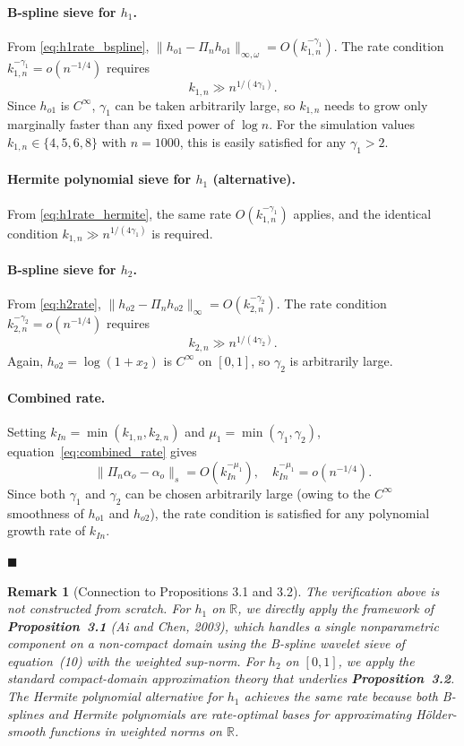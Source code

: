 \documentclass[12pt]{article}
\newtheorem{remark}{Remark}
\begin{document}
\paragraph{B-spline sieve for $h_1$.}
From \eqref{eq:h1rate_bspline}, $\|h_{o1} - \Pi_n h_{o1}\|_{\infty, \omega} = O(k_{1,n}^{-\gamma_1})$. The rate condition $k_{1,n}^{-\gamma_1} = o(n^{-1/4})$ requires
\[
k_{1,n} \gg n^{1/(4\gamma_1)}.
\]
Since $h_{o1}$ is $C^\infty$, $\gamma_1$ can be taken arbitrarily large, so $k_{1,n}$ needs to grow only marginally faster than any fixed power of $\log n$. For the simulation values $k_{1,n} \in \{4, 5, 6, 8\}$ with $n = 1000$, this is easily satisfied for any $\gamma_1 > 2$.

\paragraph{Hermite polynomial sieve for $h_1$ (alternative).}
From \eqref{eq:h1rate_hermite}, the same rate $O(k_{1,n}^{-\gamma_1})$ applies, and the identical condition $k_{1,n} \gg n^{1/(4\gamma_1)}$ is required.

\paragraph{B-spline sieve for $h_2$.}
From \eqref{eq:h2rate}, $\|h_{o2} - \Pi_n h_{o2}\|_\infty = O(k_{2,n}^{-\gamma_2})$. The rate condition $k_{2,n}^{-\gamma_2} = o(n^{-1/4})$ requires
\[
k_{2,n} \gg n^{1/(4\gamma_2)}.
\]
Again, $h_{o2} = \log(1+x_2)$ is $C^\infty$ on $[0,1]$, so $\gamma_2$ is arbitrarily large.

\paragraph{Combined rate.}
Setting $k_{In} = \min(k_{1,n}, k_{2,n})$ and $\mu_1 = \min(\gamma_1, \gamma_2)$, equation~\eqref{eq:combined_rate} gives
\[
\|\Pi_n \alpha_o - \alpha_o\|_s = O(k_{In}^{-\mu_1}), \quad k_{In}^{-\mu_1} = o(n^{-1/4}).
\]
Since both $\gamma_1$ and $\gamma_2$ can be chosen arbitrarily large (owing to the $C^\infty$ smoothness of $h_{o1}$ and $h_{o2}$), the rate condition is satisfied for any polynomial growth rate of $k_{In}$.

\hfill $\blacksquare$

\begin{remark}[Connection to Propositions 3.1 and 3.2]
The verification above is not constructed from scratch. For $h_1$ on $\mathbb{R}$, we directly apply the framework of \textbf{Proposition~3.1} (Ai and Chen, 2003), which handles a single nonparametric component on a non-compact domain using the B-spline wavelet sieve of equation~(10) with the weighted sup-norm. For $h_2$ on $[0,1]$, we apply the standard compact-domain approximation theory that underlies \textbf{Proposition~3.2}. The Hermite polynomial alternative for $h_1$ achieves the same rate because both B-splines and Hermite polynomials are \emph{rate-optimal} bases for approximating H\"{o}lder-smooth functions in weighted norms on $\mathbb{R}$.
\end{remark}
\end{document}
